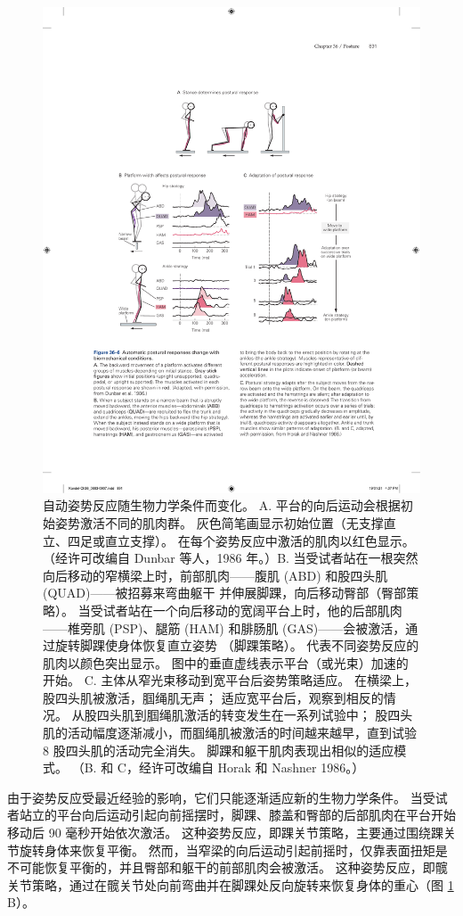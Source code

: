 \begin{figure}[htbp]
	\centering
	\includegraphics[width=0.8\linewidth]{chap36/fig_36_6}
	\caption{自动姿势反应随生物力学条件而变化。 A. 平台的向后运动会根据初始姿势激活不同的肌肉群。 灰色简笔画显示初始位置（无支撑直立、四足或直立支撑）。 在每个姿势反应中激活的肌肉以红色显示。 （经许可改编自 Dunbar 等人，1986 年。）B. 当受试者站在一根突然向后移动的窄横梁上时，前部肌肉——腹肌 (ABD) 和股四头肌 (QUAD)——被招募来弯曲躯干 并伸展脚踝，向后移动臀部（臀部策略）。 当受试者站在一个向后移动的宽阔平台上时，他的后部肌肉——椎旁肌 (PSP)、腿筋 (HAM) 和腓肠肌 (GAS)——会被激活，通过旋转脚踝使身体恢复直立姿势 （脚踝策略）。 代表不同姿势反应的肌肉以颜色突出显示。 图中的垂直虚线表示平台（或光束）加速的开始。 C. 主体从窄光束移动到宽平台后姿势策略适应。 在横梁上，股四头肌被激活，腘绳肌无声； 适应宽平台后，观察到相反的情况。 从股四头肌到腘绳肌激活的转变发生在一系列试验中； 股四头肌的活动幅度逐渐减小，而腘绳肌被激活的时间越来越早，直到试验 8 股四头肌的活动完全消失。 脚踝和躯干肌肉表现出相似的适应模式。 （B. 和 C，经许可改编自 Horak 和 Nashner 1986。）}
	\label{fig:36_6}
\end{figure}


由于姿势反应受最近经验的影响，它们只能逐渐适应新的生物力学条件。
当受试者站立的平台向后运动引起向前摇摆时，脚踝、膝盖和臀部的后部肌肉在平台开始移动后 90 毫秒开始依次激活。
这种姿势反应，即踝关节策略，主要通过围绕踝关节旋转身体来恢复平衡。
然而，当窄梁的向后运动引起前摇时，仅靠表面扭矩是不可能恢复平衡的，并且臀部和躯干的前部肌肉会被激活。
这种姿势反应，即髋关节策略，通过在髋关节处向前弯曲并在脚踝处反向旋转来恢复身体的重心（图 \ref{fig:36_6} B）。


